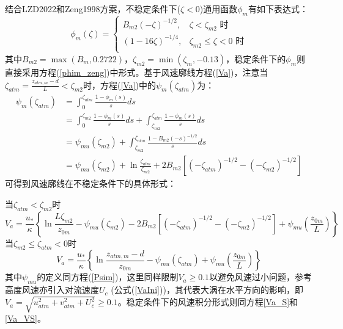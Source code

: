 结合LZD2022和Zeng1998方案，不稳定条件下($\zeta<0$)通用函数$\phi_{m}$有如下表达式：
\begin{equation}
\phi_{m}(\zeta)= \begin{cases}
   B_{m2}(-\zeta)^{-1/2}, & \zeta<\zeta_{m2} \text { 时} \\
   (1-16 \zeta)^{-1/4}, & \zeta_{m2} \leq \zeta<0 \text { 时} \\
\end{cases}
\end{equation}
其中$B_{m2}=\max(B_{m},0.2722)$，$\zeta_{m2}=\min(\zeta_{m},-0.13)$，稳定条件下的$\phi_{m}$则直接采用方程(\ref{phim_zeng})中形式。基于风速廓线方程(\ref{Va})，注意当
$\zeta_{atm}=\frac{z_{atm,m}-d}{L}<\zeta_{m2}$时，方程(\ref{Va})中的$\psi_{m}\left(\zeta_{atm}\right)$为：
\begin{align}
\psi_{m}\left(\zeta_{atm}\right) &= \int_{0}^{\zeta_{atm}} \frac{1-\phi_{m}(s)}{s} d s  \nonumber \\[1ex]
 & = \int_{0}^{\zeta_{m2}} \frac{1-\phi_{m}(s)}{s} d s + \int_{\zeta_{m2}}^{\zeta_{atm}} \frac{1-\phi_{m}(s)}{s} d s  \nonumber \\[1.5ex]
 &= \psi_{mu}(\zeta_{m2}) + \int_{\zeta_{m2}}^{\zeta_{atm}} \frac{1-B_{m2}(-s)^{-1/2}}{s} d s  \nonumber \\[1.5ex]
 & = \psi_{mu}(\zeta_{m2}) + \ln \frac{\zeta_{atm}}{\zeta_{m2}} + 2B_{m2}\left[(-\zeta_{atm})^{-1/2}-(-\zeta_{m2})^{-1/2}\right]
\end{align}
可得到风速廓线在不稳定条件下的具体形式：

\noindent 当$\zeta_{atm}<\zeta_{m2}$时
\begin{equation}\label{Va_U_LZD1}
V_{a}=\frac{u_{*}}{\kappa}\left\{\ln \frac{L\zeta_{m2}}{z_{0 m}}-\psi_{mu}\left(\zeta_{m2}\right)-2B_{m2}\left[(-\zeta_{atm})^{-1/2}-(-\zeta_{m2})^{-1/2}\right]+\psi_{mu}\left(\frac{z_{0 m}}{L}\right)\right\}
\end{equation}
\noindent 当$ \zeta_{m2} \leq \zeta_{atm}<0$时
\begin{equation}\label{Va_U_LZD2}
V_{a}=\frac{u_{*}}{\kappa}\left\{\ln \frac{z_{atm, m}-d}{z_{0 m}}-\psi_{mu}\left(\zeta_{atm}\right)+\psi_{mu}\left(\frac{z_{0 m}}{L}\right)\right\}
\end{equation}
其中$\psi_{mu}$的定义同方程(\ref{Psim})，这里同样限制$V_a\geq0.1$以避免风速过小问题，参考高度风速亦引入对流速度$U_c$ (公式(\ref{VaIni}))，其代表大涡在水平方向的影响，即
$V_{a}=\sqrt{u_{atm}^{2}+v_{atm}^{2}+U_{c}^{2}} \geq 0.1$。稳定条件下的风速积分形式则同方程\eqref{Va_S}和\eqref{Va_VS}。

